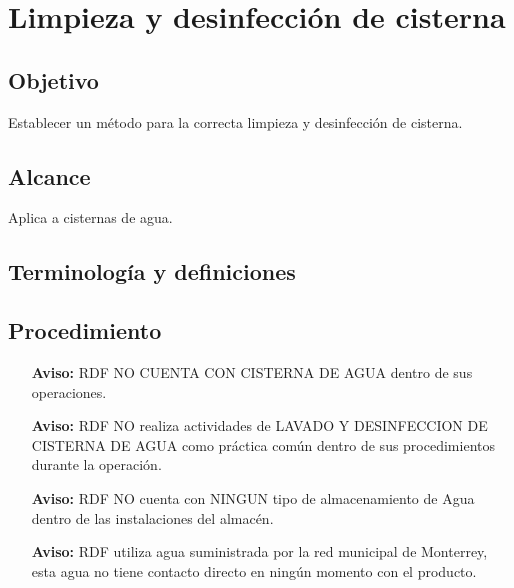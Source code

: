 \thispagestyle{formato-PI}
\renewcommand{\MenorVer}{0}
\renewcommand{\MayorVer}{2}
\renewcommand{\Codigo}{HYS-23-IT}
\renewcommand{\FechaPub}{2023--01}
\renewcommand{\Titulo}{Limpieza y desinfección de cisterna}

\section{\Titulo}

\subsection{Objetivo}
Establecer un método para la correcta limpieza y desinfección de cisterna.

\subsection{Alcance}
Aplica a cisternas de agua.

\subsection{Terminología y definiciones}
\begin{description}
\end{description}

\subsection{Procedimiento}
\begin{itemize}
	\item[\textbf{Aviso:}] \gls{RDF} NO CUENTA CON CISTERNA DE AGUA dentro de sus operaciones.
	\item[\textbf{Aviso:}] \gls{RDF} NO realiza actividades de LAVADO Y DESINFECCION DE CISTERNA DE AGUA como práctica común dentro de sus procedimientos durante la operación.
	\item[\textbf{Aviso:}] \gls{RDF} NO cuenta con NINGUN tipo de almacenamiento de Agua dentro de las instalaciones del almacén.
	\item[\textbf{Aviso:}] \gls{RDF} utiliza agua suministrada por la red municipal de Monterrey, esta agua no tiene contacto directo en ningún momento con el producto.
\end{itemize}
